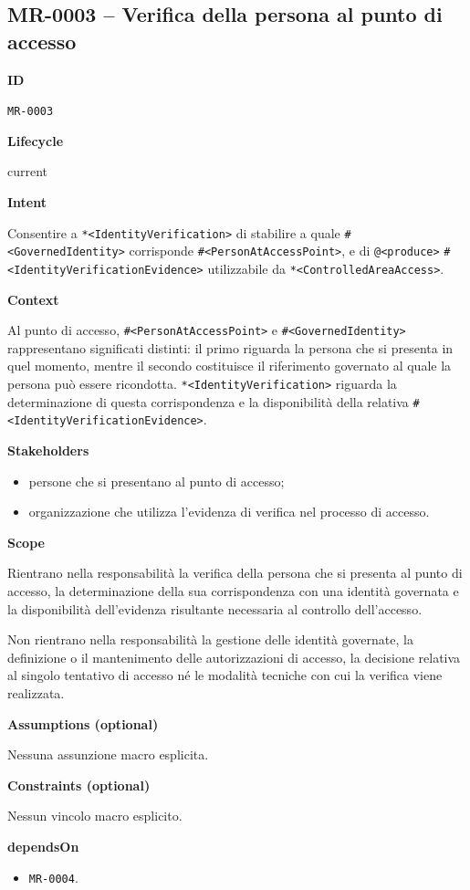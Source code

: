 \documentclass[11pt,a4paper]{article}
\makeatletter
\newcommand{\bbeh}[1]{\texttt{*<#1>}}
\newcommand{\bnon}[1]{\texttt{\#<#1>}}
\newcommand{\baop}[1]{\texttt{@<#1>}}
\newcommand{\Field}[1]{\par\medskip\noindent\textbf{#1}\par\smallskip}
\newenvironment{compactitems}{\begin{itemize}[leftmargin=1.35em,itemsep=0.1em,topsep=0.2em,parsep=0pt]}{\end{itemize}}
\makeatother
\begin{document}
\noindent
\begin{minipage}[t]{0.64\textwidth}\small
\subsection*{MR-0003 -- Verifica della persona al punto di accesso}

\Field{ID} \texttt{MR-0003}

\Field{Lifecycle} current

\Field{Intent}
Consentire a \bbeh{IdentityVerification} di stabilire a quale \bnon{GovernedIdentity} corrisponde \bnon{PersonAtAccessPoint}, e di \baop{produce} \bnon{IdentityVerificationEvidence} utilizzabile da \bbeh{ControlledAreaAccess}.

\Field{Context}
Al punto di accesso, \bnon{PersonAtAccessPoint} e \bnon{GovernedIdentity} rappresentano significati distinti: il primo riguarda la persona che si presenta in quel momento, mentre il secondo costituisce il riferimento governato al quale la persona pu\`o essere ricondotta. \bbeh{IdentityVerification} riguarda la determinazione di questa corrispondenza e la disponibilit\`a della relativa \bnon{IdentityVerificationEvidence}.

\Field{Stakeholders}
\begin{compactitems}
  \item persone che si presentano al punto di accesso;
  \item organizzazione che utilizza l'evidenza di verifica nel processo di accesso.
\end{compactitems}

\Field{Scope}
Rientrano nella responsabilit\`a la verifica della persona che si presenta al punto di accesso, la determinazione della sua corrispondenza con una identit\`a governata e la disponibilit\`a dell'evidenza risultante necessaria al controllo dell'accesso.

Non rientrano nella responsabilit\`a la gestione delle identit\`a governate, la definizione o il mantenimento delle autorizzazioni di accesso, la decisione relativa al singolo tentativo di accesso n\'e le modalit\`a tecniche con cui la verifica viene realizzata.

\Field{Assumptions (optional)} Nessuna assunzione macro esplicita.

\Field{Constraints (optional)} Nessun vincolo macro esplicito.

\Field{dependsOn}
\begin{compactitems}
  \item \texttt{MR-0004}.
\end{compactitems}
\end{minipage}\hfill
\end{document}
